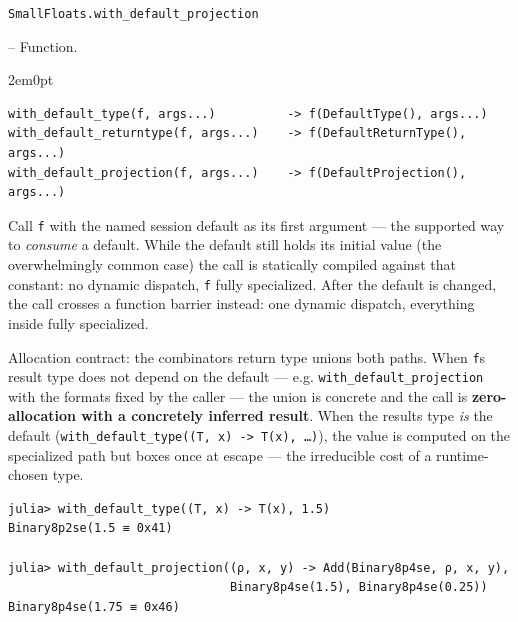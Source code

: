 \par\medskip\noindent\begin{minipage}{\linewidth}
\hypertarget{11729885955705173533}{\texttt{SmallFloats.with\_\allowbreak{}default\_\allowbreak{}projection}}  -- {Function.}
\nopagebreak
\begin{adjustwidth}{2em}{0pt}


\begin{verbatim}
with_default_type(f, args...)          -> f(DefaultType(), args...)
with_default_returntype(f, args...)    -> f(DefaultReturnType(), args...)
with_default_projection(f, args...)    -> f(DefaultProjection(), args...)
\end{verbatim}

Call \texttt{f} with the named session default as its first argument — the supported way to \emph{consume} a default. While the default still holds its initial value (the overwhelmingly common case) the call is statically compiled against that constant: no dynamic dispatch, \texttt{f} fully specialized. After the default is changed, the call crosses a function barrier instead: one dynamic dispatch, everything inside fully specialized.

Allocation contract: the combinator{\textquotesingle}s return type unions both paths. When \texttt{f}{\textquotesingle}s result type does not depend on the default — e.g. \texttt{with\_\allowbreak{}default\_\allowbreak{}projection} with the formats fixed by the caller — the union is concrete and the call is \textbf{zero-allocation with a concretely inferred result}. When the result{\textquotesingle}s type \emph{is} the default (\texttt{with\_\allowbreak{}default\_\allowbreak{}type(\allowbreak{}(\allowbreak{}T, x) -> T(\allowbreak{}x), …)}), the value is computed on the specialized path but boxes once at escape — the irreducible cost of a runtime-chosen type.


\begin{verbatim}
julia> with_default_type((T, x) -> T(x), 1.5)
Binary8p2se(1.5 ≡ 0x41)

julia> with_default_projection((ρ, x, y) -> Add(Binary8p4se, ρ, x, y),
                               Binary8p4se(1.5), Binary8p4se(0.25))
Binary8p4se(1.75 ≡ 0x46)
\end{verbatim}



\end{adjustwidth}
\end{minipage}
\par\medskip

